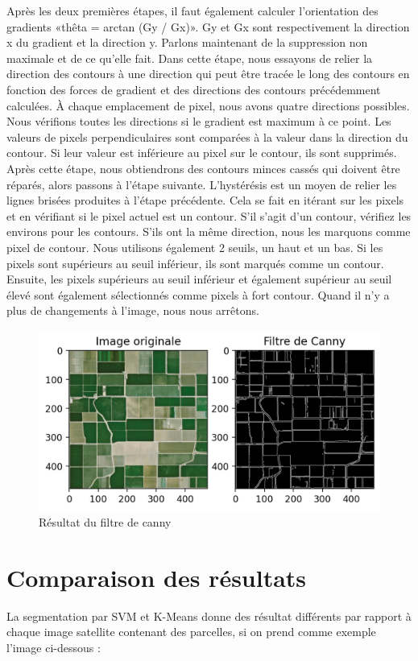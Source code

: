 \documentclass[12pt, openany]{report}
\begin{document}
Après les deux premières étapes, il faut également calculer l'orientation des gradients «thêta = arctan (Gy / Gx)». Gy et Gx sont respectivement la direction x du gradient et la direction y.
Parlons maintenant de la suppression non maximale et de ce qu'elle fait. Dans cette étape, nous essayons de relier la direction des contours à une direction qui peut être tracée le long des contours en fonction des forces de gradient et des directions des contours précédemment calculées. À chaque emplacement de pixel, nous avons quatre directions possibles. Nous vérifions toutes les directions si le gradient est maximum à ce point. Les valeurs de pixels perpendiculaires sont comparées à la valeur dans la direction du contour. Si leur valeur est inférieure au pixel sur le contour, ils sont supprimés. Après cette étape, nous obtiendrons des contours minces cassés qui doivent être réparés, alors passons à l'étape suivante.
L'hystérésis est un moyen de relier les lignes brisées produites à l'étape précédente. Cela se fait en itérant sur les pixels et en vérifiant si le pixel actuel est un contour. S'il s'agit d'un contour, vérifiez les environs pour les contours. S'ils ont la même direction, nous les marquons comme pixel de contour. Nous utilisons également 2 seuils, un haut et un bas. Si les pixels sont supérieurs au seuil inférieur, ils sont marqués comme un contour. Ensuite, les pixels supérieurs au seuil inférieur et également supérieur au seuil élevé sont également sélectionnés comme pixels à fort contour. Quand il n'y a plus de changements à l'image, nous nous arrêtons.

\begin{figure}[H]
\centering
\includegraphics[scale=1.2]{canny_filter.png}
\caption{Résultat du filtre de canny}
\end{figure}

\section{Comparaison des résultats}
La segmentation par SVM et K-Means donne des résultat différents par rapport à chaque image satellite contenant des parcelles, si on prend comme exemple l'image ci-dessous : 
\end{document}
